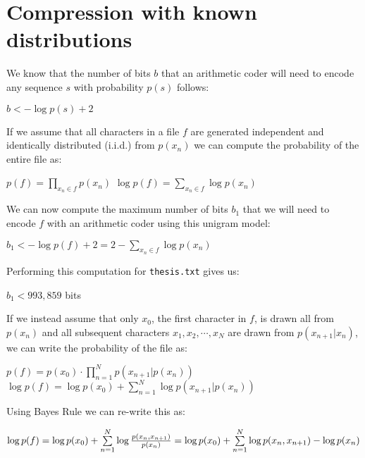 \documentclass[10pt,a4paper,oneside,onecolumn]{article}
\newcommand*{\thesisTXT}{{\tt thesis.txt}\xspace}
\newcommand*{\iid}{i.i.d.\xspace}
\begin{document}
\section{Compression with known distributions}\label{sec:ex3}

We know \cite[p.~21]{it4} that the number of bits $b$ that an arithmetic coder
will need to encode any sequence $s$ with probability $p(s)$ follows:

\begin{center}
    $b < -\log p(s) + 2$
\end{center}

If we assume that all characters in a file $f$ are generated independent and
identically distributed (\iid) from $p(x_n)$ we can compute the probability of
the entire file as:

\begin{center}
    $p(f) = \prod\limits_{x_n \in f} p(x_n)$
    $\log p(f) = \sum\limits_{x_n \in f} \log p(x_n)$
\end{center}

We can now compute the maximum number of bits $b_1$ that we will need to encode
$f$ with an arithmetic coder using this unigram model:

\begin{center}
    $b_1 < -\log p(f) + 2 = 2 - \sum\limits_{x_n \in f} \log p(x_n)$
\end{center}

Performing this computation for \thesisTXT gives us:

\begin{center}
    $b_1 < 993,859$ bits
\end{center}

If we instead assume that only $x_0$, the first character in $f$, is drawn all
from $p(x_n)$ and all subsequent characters $x_1, x_2, \cdots, x_N$ are drawn
from $p(x_{n+1} | x_n)$, we can write the probability of the file as:

\begin{center}
    $p(f) = p(x_0) \cdot \prod\limits_{n = 1}^{N} p(x_{n + 1} | p(x_n))$
    $\log p(f) = \log p(x_0) + \sum\limits_{n = 1}^{N} \log p(x_{n + 1} | p(x_n))$
\end{center}

Using Bayes Rule we can re-write this as:

\begin{center}
    $\log p(f)
    = \log p(x_0) + \sum\limits_{n = 1}^{N} \log {p(x_n, x_{n + 1}) \over p(x_n)}
    = \log p(x_0) + \sum\limits_{n = 1}^{N} \log p(x_n, x_{n + 1}) - \log p(x_n)$
\end{center}
\end{document}

